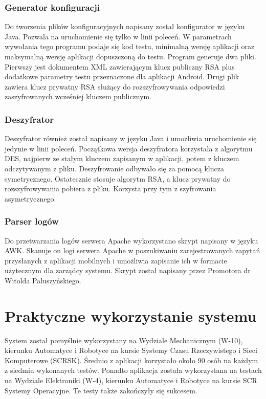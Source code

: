 \documentclass[eng]{mgr}
\begin{document}
			\subsection{Generator konfiguracji}
			Do tworzenia plików konfiguracyjnych napisany został konfigurator w języku Java. Pozwala na uruchomienie się tylko w linii poleceń. W parametrach wywołania tego programu podaje się kod testu, minimalną wersję aplikacji oraz maksymalną wersję aplikacji dopuszczoną do testu. Program generuje dwa pliki. Pierwszy jest dokumentem XML zawierającym klucz publiczny RSA plus dodatkowe parametry testu przeznaczone dla aplikacji Android. Drugi plik zawiera klucz prywatny RSA służący do rozszyfrowywania odpowiedzi zaszyfrowanych wcześniej kluczem publicznym.
			
			\subsection{Deszyfrator}
			Deszyfrator również został napisany w języku Java i umożliwia uruchomienie się jedynie w linii poleceń. Początkowa wersja deszyfratora korzystała z algorytmu DES, najpierw ze stałym kluczem zapisanym w aplikacji, potem z kluczem odczytywanym z pliku. Deszyfrowanie odbywało się za pomocą klucza symetrycznego. Ostatecznie stosuje algorytm RSA, a klucz prywatny do rozszyfrowywania pobiera z pliku. Korzysta przy tym z szyfrowania asymetrycznego.
			
			\subsection{Parser logów}
			Do przetwarzania logów serwera Apache wykorzystano skrypt napisany w języku AWK. Skanuje on logi serwera Apache w poszukiwaniu zarejestrowanych zapytań przysłanych z aplikacji mobilnych i umożliwia zapisanie ich w formacie użytecznym dla zarządcy systemu. Skrypt został napisany przez Promotora dr Witolda Paluszyńskiego.
			

	\chapter{Praktyczne wykorzystanie systemu}
	
	System został pomyślnie wykorzystany na Wydziale Mechanicznym (W-10), kierunku Automatyce i Robotyce na kursie Systemy Czasu Rzeczywistego i Sieci Komputerowe (SCRSK). Średnio z aplikacji korzystało około 90 osób na każdym z siedmiu wykonanych testów. Ponadto aplikacja została wykorzystana na testach na Wydziale Elektroniki (W-4), kierunku Automatyce i Robotyce na kursie SCR Systemy Operacyjne. Te testy także zakończyły się sukcesem.
	
\end{document}
